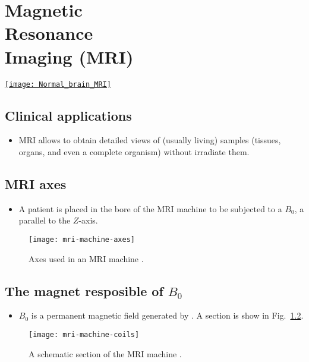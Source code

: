 \chapter{Magnetic\\Resonance\\Imaging (MRI)}
\vspace{-50ex}
\begin{flushright}
\href{https://www.sciencephoto.com/media/728494/view/normal-brain-mri}{\texttt{[image: Normal\_brain\_MRI]}}
\end{flushright}

\section{Clinical applications}
\begin{itemize}
\item \gls{MRI}
  \cite{westbrook2018mri,Wu2022MRI_Physics,thePIRL2018NMR_basics,thePIRL2018SpinEcho,thePIRL2018Fourier,thePIRL2018GRE}
  allows to obtain detailed views of (usually living) samples
  (tissues, organs, and even a complete organism) without irradiate
  them.
\end{itemize}

\section{MRI axes}
\begin{itemize}
\item A patient is placed in the bore of the MRI machine to be
  subjected to a $B_0$, a  parallel to the $Z$-axis.
\end{itemize}
\vspace{-4ex}
\begin{figure}[!b]
  \centering
  \texttt{[image: mri-machine-axes]}
  \caption{Axes used in an MRI machine \cite{abdulla2025MRI_machine}.}
  \label{fig:MRI_axes}
\end{figure}

\section{The magnet resposible of $B_0$}
\begin{itemize}
\item $B_0$ is a permanent magnetic field generated by . A section is
  show in Fig.~\ref{fig:MRI_machine_scheme}.
\end{itemize}
\vspace{-4ex}
\begin{figure}[!b]
  \centering
  \texttt{[image: mri-machine-coils]}
  \caption{A schematic section of the MRI machine \cite{abdulla2025MRI_machine}.}
  \label{fig:MRI_machine_scheme}
\end{figure}

